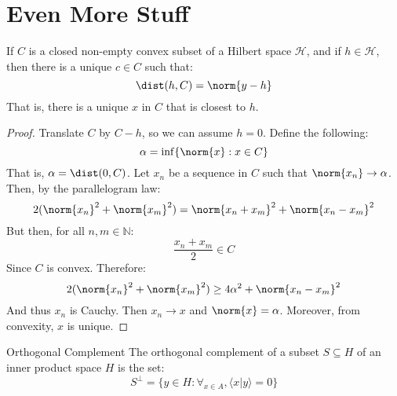 \documentclass[crop=false,class=book,oneside]{standalone}                      %
\begin{document}
    \section{Even More Stuff}
        \begin{theorem}
            If $C$ is a closed non-empty convex subset of a
            Hilbert space $\mathcal{H}$, and if
            $h\in\mathcal{H}$, then there is a unique
            $c\in{C}$ such that:
            \begin{equation}
                \dist(h,C)=\norm{y-h}
            \end{equation}
            That is, there is a unique $x$ in $C$ that is
            closest to $h$.
        \end{theorem}
        \begin{proof}
            Translate $C$ by $C-h$, so we can assume $h=0$.
            Define the following:
            \begin{equation}
                \alpha=\inf\{\norm{x}:x\in{C}\}
            \end{equation}
            That is, $\alpha=\dist(0,C)$. Let $x_{n}$
            be a sequence in $C$ such that
            $\norm{x_{n}}\rightarrow\alpha$. Then, by the
            parallelogram law:
            \begin{equation}
                2(\norm{x_{n}}^{2}+\norm{x_{m}}^{2})=
                \norm{x_{n}+x_{m}}^{2}+
                \norm{x_{n}-x_{m}}^{2}
            \end{equation}
            But then, for all $n,m\in\mathbb{N}$:
            \begin{equation}
                \frac{x_{n}+x_{m}}{2}\in{C}
            \end{equation}
            Since $C$ is convex. Therefore:
            \begin{equation}
                2(\norm{x_{n}}^{2}+\norm{x_{m}}^{2})
                \geq4\alpha^{2}+\norm{x_{n}-x_{m}}^{2}
            \end{equation}
            And thus $x_{n}$ is Cauchy. Then
            $x_{n}\rightarrow{x}$ and $\norm{x}=\alpha$.
            Moreover, from convexity, $x$ is unique.
        \end{proof}
        \begin{ldefinition}{Orthogonal Complement}
            The orthogonal complement of a subset
            $S\subseteq{H}$ of an inner product space
            $H$ is the set:
            \begin{equation}
                S^{\perp}=\{y\in{H}:\forall_{x\in{A}},
                    \langle{x|y}\rangle=0\}
            \end{equation}
        \end{ldefinition}
\end{document}
